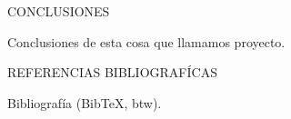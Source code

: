 \documentclass[final]{beamer}
\newlength{\sepwidth}
\newlength{\colwidth}
\newcommand{\separatorcolumn}{\begin{column}{\sepwidth}\end{column}}
\begin{document}
\begin{frame}[t]
\begin{columns}[t]
\begin{column}{\colwidth}
  \begin{block}{CONCLUSIONES}

    Conclusiones de esta cosa que llamamos proyecto.

  \end{block}

  \begin{block}{REFERENCIAS BIBLIOGRAFÍCAS}

    Bibliografía (BibTeX, btw).

  \end{block}

  

\end{column}
\separatorcolumn



\end{columns}
\end{frame}
\end{document}
